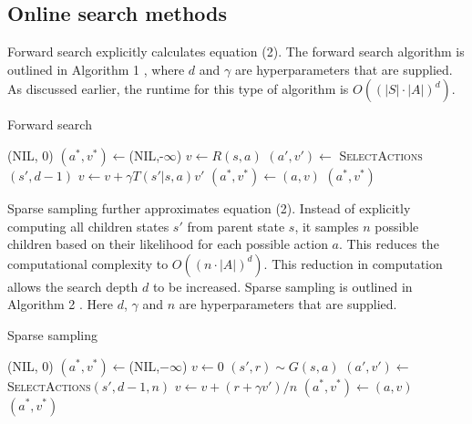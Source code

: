 \documentclass[conference]{IEEEtran}
\begin{document}
\subsection{Online search methods}
Forward search explicitly calculates equation (2). The forward search algorithm is outlined in Algorithm 1 \cite{d}, where $d$ and $\gamma$ are hyperparameters that are supplied. As discussed earlier, the runtime for this type of algorithm is $O((|S|\cdot |A|)^d).$
\begin{algorithm}
	\caption{Forward search}
	\begin{algorithmic}[1]
		 \Return (NIL, 0)
		\EndIf
		\State $(a^*, v^*) \leftarrow$(NIL,-$\infty$)
		\State $v \leftarrow R(s,a)$
		\State $(a',v') \leftarrow $ \textsc{SelectActions}$(s',d-1)$
		\State $v \leftarrow v + \gamma T(s'|s,a)v'$
		\EndFor
		 $(a^*, v^*) \leftarrow (a,v)$
		\EndIf
		\EndFor
		\State\Return $(a^*,v^*)$
		\EndFunction
	\end{algorithmic}
\end{algorithm}

Sparse sampling further approximates equation (2). Instead of explicitly computing all children states $s'$ from parent state $s$, it samples $n$ possible children based on their likelihood for each possible action $a$. This reduces the computational complexity to $O((n \cdot |A|)^d).$ This reduction in computation allows the search depth $d$ to be increased. Sparse sampling is outlined in Algorithm 2 \cite{d}. Here $d$, $\gamma$ and $n$ are hyperparameters that are supplied.
\begin{algorithm}
	\caption{Sparse sampling}
	\begin{algorithmic}[1]
		 \Return (NIL, 0)
		\EndIf
		\State $(a^*, v^*) \leftarrow$(NIL,$-\infty$)
		\State $v \leftarrow 0$
		\State $(s',r) \sim G(s,a)$
		\State $(a',v') \leftarrow $ \textsc{SelectActions}$(s',d-1,n)$
		\State $v \leftarrow v + (r + \gamma v')/n$
		\EndFor
		 $(a^*, v^*) \leftarrow (a,v)$
		\EndIf
		\EndFor
		\State\Return $(a^*,v^*)$
		\EndFunction
	\end{algorithmic}
\end{algorithm}
\end{document}
